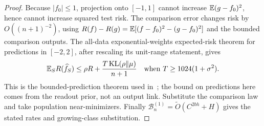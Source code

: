 \begin{proof}
Because $|f_0|\le1$, projection onto $[-1,1]$ cannot increase
$\mathbb E(g-f_0)^2$, hence cannot increase squared test risk.  The comparison
error changes risk by $O((n+1)^{-2})$, using
$R(f)-R(g)=\mathbb E[(f-f_0)^2-(g-f_0)^2]$ and the bounded comparison outputs.
The all-data exponential-weights expected-risk theorem for predictions
in $[-2,2]$, after rescaling its unit-range statement, gives
\[
 \mathbb E_S R(\widehat f_S)\le\rho R+
                   \frac{T\operatorname{KL}(\rho\|\mu)}{n+1}
 \quad\text{when }T\ge1024(1+\sigma^2).
\]
This is the bounded-prediction theorem used in~\cite{rawprior}; the bound
on predictions here comes from the readout prior, not an output link.
Substitute the comparison law and take population near-minimizers.
Finally $\mathcal B_n^{(1)}=\widetilde O(C^{2bh}+H)$ gives the stated
rates and growing-class substitution.
\end{proof}
